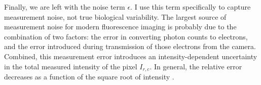 Finally, we are left with the noise term $\epsilon$. I use this
term specifically to capture measurement noise, not true biological
variability. The largest source of measurement
noise for modern fluorescence imaging
is probably due to the combination of two factors: the error in converting
photon counts to electrons, and the error introduced during transmission
of those electrons from the camera. Combined, this measurement error
introduces an intensity-dependent uncertainty in the total measured
intensity of the pixel $I_{r,c}$. In general, the relative error
decreases as a function of the square root of intensity \cite{Goldman2005}.


